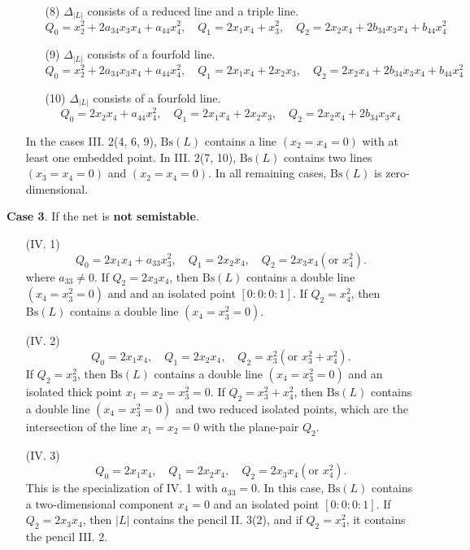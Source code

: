 \documentclass{amsart}[12pt]
\theoremstyle{definition}
\theoremstyle{remark}
\numberwithin{equation}{section}
\newcommand{\abs}[1]{\lvert#1\rvert}
\begin{document}
\begin{itemize}
\begin{itemize}
\[\]
\item[(8)] $\Delta_{\abs{L}}$ consists of a reduced line and a triple line.
\[
Q_0 = x_2^2 + 2a_{34}x_3x_4 + a_{44}x_4^2, \quad Q_1 = 2x_1x_4 + x_3^2,  \quad Q_2 = 2x_2x_4 + 2b_{34}x_3x_4 + b_{44}x_4^2 
\]
\item[(9)] $\Delta_{\abs{L}}$ consists of a fourfold line.
\[
Q_0 = x_2^2 + 2a_{34}x_3x_4 + a_{44}x_4^2, \quad Q_1 = 2x_1x_4 + 2x_2x_3,  \quad Q_2 = 2x_2x_4 + 2b_{34}x_3x_4 + b_{44}x_4^2 
\]
\item[(10)] $\Delta_{\abs{L}}$ consists of a fourfold line.
\[
Q_0 = 2x_2x_4 + a_{44}x_4^2, \quad Q_1 = 2x_1x_4 + 2x_2x_3,  \quad Q_2 = 2x_2x_4 + 2b_{34}x_3x_4 
\]
\end{itemize}
In the cases III. 2(4, 6, 9), $\mathrm{Bs}(L)$ contains a line $(x_2 = x_4 = 0)$ with at least one embedded point. In III. 2(7, 10), $\mathrm{Bs}(L)$ contains two lines $(x_3 = x_4 = 0)$ and $(x_2 = x_4 = 0)$. In all remaining cases, $\mathrm{Bs}(L)$ is zero-dimensional. 
\end{itemize}


\textbf{Case 3}. If the net is \textbf{not semistable}. 
\begin{itemize}
\item[(IV. 1)] 
\[
Q_0 = 2x_1x_4 + a_{33}x_3^2, \quad Q_1 = 2x_2x_4, \quad Q_2 = 2x_3x_4 ( \textrm{or } x_4^2).
\]
where $a_{33} \neq 0$. If $Q_2 = 2x_3x_4$, then $\mathrm{Bs}(L)$ contains a double line $(x_4 = x_3^2 = 0)$ and and an isolated point $[0 \colon 0 \colon 0 \colon 1]$. If $Q_2 = x_4^2$, then $\mathrm{Bs}(L)$ contains a double line $(x_4 = x_3^2 = 0)$.
\item[(IV. 2)] 
\[
Q_0 = 2x_1x_4, \quad Q_1 = 2x_2x_4, \quad Q_2 = x_3^2 ( \textrm{or } x_3^2 + x_4^2).
\]
If $Q_2 = x_3^2$, then $\mathrm{Bs}(L)$ contains a double line $(x_4 = x_3^2 = 0)$ and an isolated thick point $x_1 = x_2 = x_3^2 = 0$. If $Q_2 = x_3^2 + x_4^2$, then $\mathrm{Bs}(L)$ contains a double line $(x_4 = x_3^2 = 0)$ and two reduced isolated points, which are the intersection of the line $x_1 = x_2 = 0$ with the plane-pair $Q_2$. 
\item[(IV. 3)] 
\[
Q_0 = 2x_1x_4, \quad Q_1 = 2x_2x_4, \quad Q_2 = 2x_3x_4 ( \textrm{or } x_4^2).
\]
This is the specialization of IV. 1 with $a_{33} = 0$. In this case, $\mathrm{Bs}(L)$ contains a two-dimensional component $x_4 = 0$ and an isolated point $[0 \colon 0 \colon 0 \colon 1]$. If $Q_2 = 2x_3x_4$, then $\abs{L}$ contains the pencil II. 3(2), and if $Q_2 = x_4^2$, it contains the pencil III. 2. 

\end{itemize}
\end{document}
